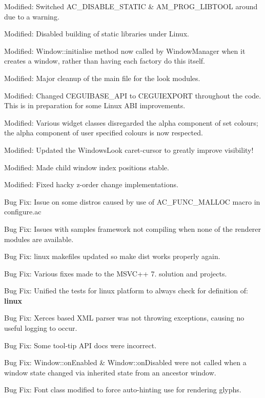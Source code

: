 \begin{DoxyItemize}
\item Modified\+: Switched A\+C\+\_\+\+D\+I\+S\+A\+B\+L\+E\+\_\+\+S\+T\+A\+T\+IC \& A\+M\+\_\+\+P\+R\+O\+G\+\_\+\+L\+I\+B\+T\+O\+OL around due to a warning.
\item Modified\+: Disabled building of static libraries under Linux.
\item Modified\+: Window\+::initialise method now called by Window\+Manager when it creates a window, rather than having each factory do this itself.
\item Modified\+: Major cleanup of the main file for the \textquotesingle{}look\textquotesingle{} modules.
\item Modified\+: Changed C\+E\+G\+U\+I\+B\+A\+S\+E\+\_\+\+A\+PI to C\+E\+G\+U\+I\+E\+X\+P\+O\+RT throughout the code. This is in preparation for some Linux A\+BI improvements.
\item Modified\+: Various widget classes disregarded the alpha component of set colours; the alpha component of user specified colours is now respected.
\item Modified\+: Updated the Windows\+Look caret-\/cursor to greatly improve visibility!
\item Modified\+: Made child window index positions stable.
\item Modified\+: Fixed hacky z-\/order change implementations.
\item Bug Fix\+: Issue on some distros caused by use of A\+C\+\_\+\+F\+U\+N\+C\+\_\+\+M\+A\+L\+L\+OC macro in configure.\+ac
\item Bug Fix\+: Issues with samples framework not compiling when none of the renderer modules are available.
\item Bug Fix\+: linux makefiles updated so \textquotesingle{}make dist\textquotesingle{} works properly again.
\item Bug Fix\+: Various fixes made to the M\+S\+V\+C++ 7. solution and projects.
\item Bug Fix\+: Unified the tests for linux platform to always check for definition of\+: {\bfseries{linux}}
\item Bug Fix\+: Xerces based X\+ML parser was not throwing exceptions, causing no useful logging to occur.
\item Bug Fix\+: Some tool-\/tip A\+PI docs were incorrect.
\item Bug Fix\+: Window\+::on\+Enabled \& Window\+::on\+Disabled were not called when a window state changed via inherited state from an ancestor window.
\item Bug Fix\+: Font class modified to force auto-\/hinting use for rendering glyphs.

\end{DoxyItemize}
